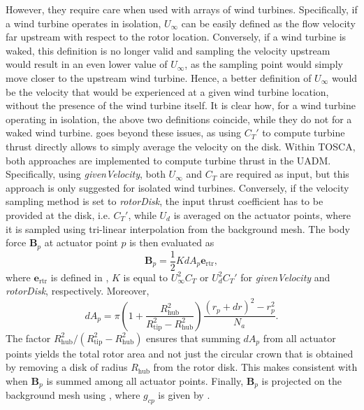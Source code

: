 However, they require care when used with arrays of wind turbines. Specifically, if a wind turbine operates in isolation, $U_\infty$ can be easily defined as the flow velocity far upstream with respect to the rotor location. Conversely, if a wind turbine is waked, this definition is no longer valid and sampling the velocity upstream would result in an even lower value of $U_\infty$, as the sampling point would simply move closer to the upstream wind turbine. Hence, a better definition of $U_\infty$ would be the velocity that would be experienced at a given wind turbine location, without the presence of the wind turbine itself. It is clear how, for a wind turbine operating in isolation, the above two definitions coincide, while they do not for a waked wind turbine.  goes beyond these issues, as using $C_T'$ to compute turbine thrust directly allows to simply average the velocity on the disk. Within TOSCA, both approaches are implemented to compute turbine thrust in the UADM. Specifically, using \textit{givenVelocity}, both $U_\infty$ and $C_T$ are required as input, but this approach is only suggested for isolated wind turbines. Conversely, if the velocity sampling method is set to \textit{rotorDisk}, the input thrust coefficient has to be provided at the disk, i.e. $C_T'$, while $U_d$ is averaged on the actuator points, where it is sampled using tri-linear interpolation from the background mesh. The body force $\mathbf{B}_p$ at actuator point $p$ is then evaluated as 
\begin{equation}
	\mathbf{B}_p = \frac{1}{2}KdA_p\mathbf{e}_\text{rtr}, \label{eq:thrustUADM}
\end{equation}
where $\mathbf{e}_\text{rtr}$ is defined in , $K$ is equal to $U_\infty^2C_T$ or $U_d^2C_T'$ for \textit{givenVelocity} and \textit{rotorDisk}, respectively. Moreover,
\begin{equation}
	dA_p = \pi\left(1 + \frac{R_\text{hub}^2}{R_\text{tip}^2 - R_\text{hub}^2}\right)\frac{(r_p + dr)^2 - r_p^2}{N_a}. \label{eq:dAreaUADM}
\end{equation}
The factor $R_\text{hub}^2/(R_\text{tip}^2 - R_\text{hub}^2)$ ensures that summing $dA_p$ from all actuator points yields the total rotor area and not just the circular crown that is obtained by removing a disk of radius $R_\text{hub}$ from the rotor disk. This makes  consistent with  when $\mathbf{B}_p$ is summed among all actuator points. Finally, $\mathbf{B}_p$ is projected on the background mesh using , where $g_{cp}$ is given by . 

